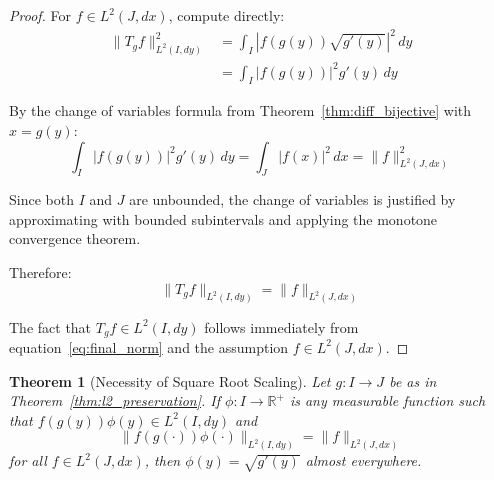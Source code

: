 \documentclass[11pt]{article}
\theoremstyle{theorem}
\newtheorem{theorem}{Theorem}[section]
\theoremstyle{definition}
\begin{document}
\begin{proof}
For $f \in L^2(J, dx)$, compute directly:
\begin{align}
\|T_g f\|_{L^2(I, dy)}^2 &= \int_I |f(g(y)) \sqrt{g'(y)}|^2 \, dy \label{eq:norm_calc1}\\
&= \int_I |f(g(y))|^2 g'(y) \, dy \label{eq:norm_calc2}
\end{align}

By the change of variables formula from Theorem~\ref{thm:diff_bijective} with $x = g(y)$:
\begin{equation}
\label{eq:change_vars_apply}
\int_I |f(g(y))|^2 g'(y) \, dy = \int_J |f(x)|^2 \, dx = \|f\|_{L^2(J, dx)}^2
\end{equation}

Since both $I$ and $J$ are unbounded, the change of variables is justified by approximating with bounded subintervals and applying the monotone convergence theorem.

Therefore:
\begin{equation}
\label{eq:final_norm}
\|T_g f\|_{L^2(I, dy)} = \|f\|_{L^2(J, dx)}
\end{equation}

The fact that $T_g f \in L^2(I, dy)$ follows immediately from equation~\eqref{eq:final_norm} and the assumption $f \in L^2(J, dx)$.
\end{proof}

\begin{theorem}[Necessity of Square Root Scaling]
\label{thm:necessity}
Let $g: I \to J$ be as in Theorem~\ref{thm:l2_preservation}. If $\phi: I \to \mathbb{R}^+$ is any measurable function such that $f(g(y))\phi(y) \in L^2(I, dy)$ and
\begin{equation}
\label{eq:general_norm}
\|f(g(\cdot))\phi(\cdot)\|_{L^2(I, dy)} = \|f\|_{L^2(J, dx)}
\end{equation}
for all $f \in L^2(J, dx)$, then $\phi(y) = \sqrt{g'(y)}$ almost everywhere.
\end{theorem}
\end{document}
